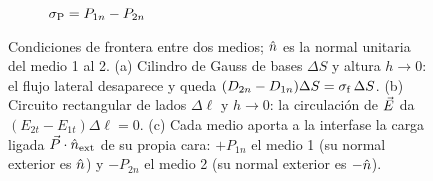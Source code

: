 \begin{figure}[t]
\begin{subfigure}[b]{0.32\textwidth}
\caption{$\sigma_{\mathrm P}=P_{1n}-P_{2n}$}
\end{subfigure}
\caption{Condiciones de frontera entre dos medios; $\hat n$ es la normal unitaria del medio 1 al 2.
(a) Cilindro de Gauss de bases $\Delta S$ y altura $h\to0$: el flujo lateral desaparece y queda
$(D_{2n}-D_{1n})\Delta S=\sigma_{\mathrm f}\,\Delta S$. (b) Circuito rectangular de lados $\Delta\ell$ y $h\to0$:
la circulación de $\vec E$ da $(E_{2t}-E_{1t})\Delta\ell=0$. (c) Cada medio aporta a la interfase la carga
ligada $\vec P\cdot\hat n_{\mathrm{ext}}$ de su propia cara: $+P_{1n}$ el medio 1 (su normal exterior es $\hat n$)
y $-P_{2n}$ el medio 2 (su normal exterior es $-\hat n$).}
\label{fig:frontera}
\end{figure}
